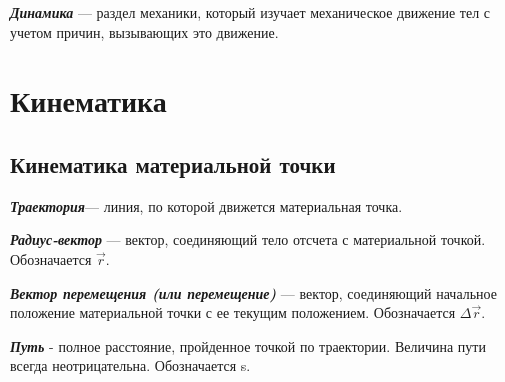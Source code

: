 \documentclass[../main.tex]{subfiles}
\begin{document}
\vspace{5px}

 \textbf{\textit{Динамика}} --- раздел механики, который изучает механическое движение тел с учетом причин, вызывающих это движение.

\vspace{3px}

\section{Кинематика}
\subsection{Кинематика материальной точки}
 \textbf{\textit{Траектория}}--- линия, по которой движется материальная точка.

\vspace{5px}

 \textbf{\textit{Радиус-вектор}} --- вектор, соединяющий тело отсчета с материальной точкой. Обозначается $\vec r$.

\vspace{5px}

 \textbf{\textit{Вектор перемещения (или перемещение)}} --- вектор, соединяющий начальное положение материальной точки с ее текущим положением. Обозначается $\Delta \vec r$.

\vspace{5px}

 \textbf{\textit{Путь}} - полное расстояние, пройденное точкой по траектории. Величина пути всегда неотрицательна. Обозначается s.

\vspace{5px}
\end{document}
